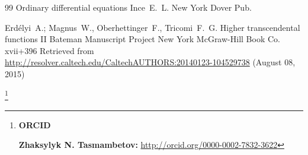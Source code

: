 \begin{thebibliography}{99}
\book Ordinary differential equations
\by Ince~E.~L.
\publaddr New York
\publ Dover Pub.

\by Erd\'elyi~A.; Magnus~W., Oberhettinger~F., Tricomi~F.~G.
\book Higher transcendental functions
\bookvol II
\serial Bateman Manuscript Project
\publaddr New York
\publ McGraw-Hill Book Co.
\totalpages  xvii+396 
\elink Retrieved from  \url{http://resolver.caltech.edu/CaltechAUTHORS:20140123-104529738} (August 08, 2015)

\end{thebibliography}

\RuDate


\newpage


\makeentitle



\smallskip




\thanks{{\bf ORCID}

{\bf Zhaksylyk N. Tasmambetov:} \url{http://orcid.org/0000-0002-7832-3622}

}




\EngRef

